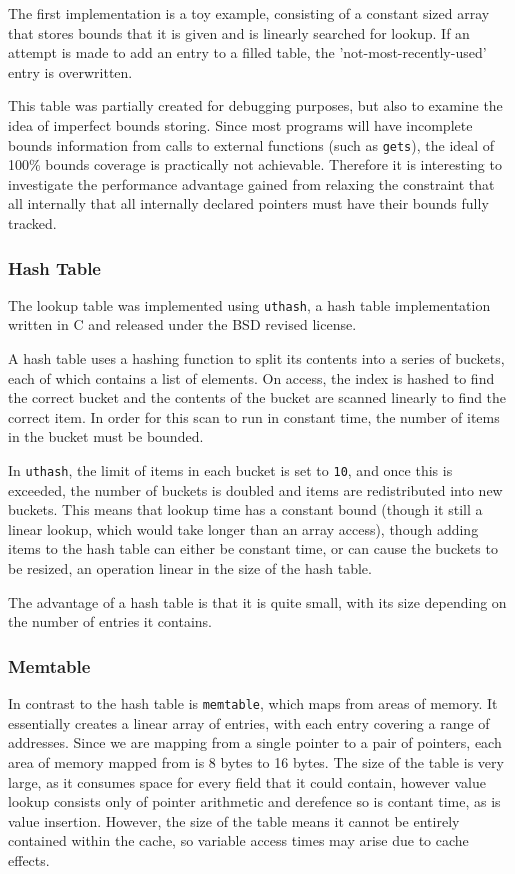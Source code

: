 The first implementation is a toy example, consisting of a constant sized array that stores bounds that it is given and is linearly searched for lookup.
If an attempt is made to add an entry to a filled table, the 'not-most-recently-used' entry is overwritten.

This table was partially created for debugging purposes, but also to examine the idea of imperfect bounds storing.
Since most programs will have incomplete bounds information from calls to external functions (such as \verb!gets!), the ideal of 100\% bounds coverage is practically not achievable.
Therefore it is interesting to investigate the performance advantage gained from relaxing the constraint that all internally that all internally declared pointers must have their bounds fully tracked.

\subsubsection{Hash Table}

The lookup table was implemented using \verb!uthash!, a hash table implementation written in C and released under the BSD revised license. 

A hash table uses a hashing function to split its contents into a series of buckets, each of which contains a list of elements.
On access, the index is hashed to find the correct bucket and the contents of the bucket are scanned linearly to find the correct item.
In order for this scan to run in constant time, the number of items in the bucket must be bounded.

In \verb!uthash!, the limit of items in each bucket is set to \verb!10!, and once this is exceeded, the number of buckets is doubled and items are redistributed into new buckets.
This means that lookup time has a constant bound (though it still a linear lookup, which would take longer than an array access), though adding items to the hash table can either be constant time, or can cause the buckets to be resized, an operation linear in the size of the hash table.

The advantage of a hash table is that it is quite small, with its size depending on the number of entries it contains.

\subsubsection{Memtable}

In contrast to the hash table is \verb!memtable!, which maps from areas of memory.
It essentially creates a linear array of entries, with each entry covering a range of addresses.
Since we are mapping from a single pointer to a pair of pointers, each area of memory mapped from is 8 bytes to 16 bytes.
The size of the table is very large, as it consumes space for every field that it could contain, however value lookup consists only of pointer arithmetic and derefence so is contant time, as is value insertion.
However, the size of the table means it cannot be entirely contained within the cache, so variable access times may arise due to cache effects.

